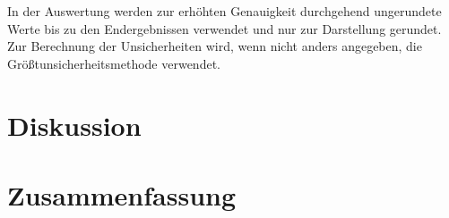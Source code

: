 \documentclass[12pt,a4paper,twoside]{article}
\begin{document}
In der Auswertung werden zur erhöhten Genauigkeit durchgehend ungerundete Werte bis zu den Endergebnissen verwendet und nur zur Darstellung gerundet. \\
Zur Berechnung der Unsicherheiten wird, wenn nicht anders angegeben, die Größtunsicherheitsmethode verwendet.


\section{Diskussion} %


\section{Zusammenfassung} %


\printbibliography[heading=bibintoc]
\end{document}
